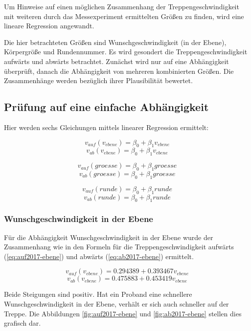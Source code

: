 
Um Hinweise auf einen möglichen Zusammenhang der Treppengeschwindigkeit mit weiteren durch das Messexperiment ermittelten Größen zu finden, wird eine lineare 
Regression angewandt.

Die hier betrachteten Größen sind Wunschgeschwindigkeit (in der Ebene),
Körpergröße und Rundennummer. Es wird gesondert die Treppengeschwindigkeit aufwärts und abwärts betrachtet.
Zunächst wird nur auf eine Abhängigkeit überprüft, danach die Abhängigkeit von mehreren kombinierten Größen. Die Zusammenhänge werden bezüglich ihrer Plausibilität bewertet.

\subsection{Prüfung auf eine einfache Abhängigkeit}

Hier werden sechs Gleichungen mittels linearer Regression ermittelt: 

\[v_{auf}(v_{ebene}) = \beta_0 + \beta_1 v_{ebene}\]
\[v_{ab}(v_{ebene}) = \beta_0 + \beta_1 v_{ebene}\]

\[v_{auf}(groesse) = \beta_0 + \beta_1 groesse\]
\[v_{ab}(groesse) = \beta_0 + \beta_1 groesse\]

\[v_{auf}(runde) = \beta_0 + \beta_1 runde\]
\[v_{ab}(runde) = \beta_0 + \beta_1 runde\]

\subsubsection{Wunschgeschwindigkeit in der Ebene}

Für die Abhängigkeit Wunschgeschwindigkeit in der Ebene wurde 
der Zusammenhang wie in den Formeln für die Treppengeschwindigkeit aufwärts (\ref{eq:auf2017-ebene}) und abwärts (\ref{eq:ab2017-ebene}) ermittelt. 

\begin{equation} \label{eq:auf2017-ebene}
	v_{auf}(v_{ebene}) = 0.294389 + 0.393467 v_{ebene}
\end{equation}
\begin{equation} \label{eq:ab2017-ebene}
	v_{ab}(v_{ebene}) = 0.475883 + 0.453419 v_{ebene}
\end{equation}

Beide Steigungen sind positiv. Hat ein Proband eine schnellere Wunschgeschwindigkeit in der Ebene, verhält er sich auch schneller auf 
der Treppe. Die Abbildungen \ref{fig:auf2017-ebene} und \ref{fig:ab2017-ebene}
stellen dies grafisch dar. 

